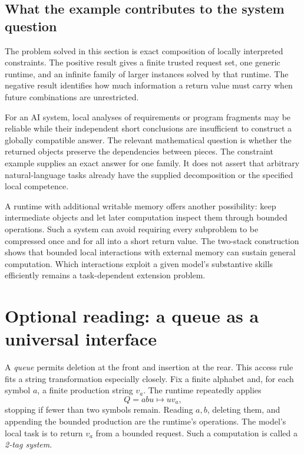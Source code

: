 \documentclass[11pt,twoside]{article}
\theoremstyle{definition}
\theoremstyle{remark}
\begin{document}
\subsection{What the example contributes to the system question}

The problem solved in this section is exact composition of locally
interpreted constraints. The positive result gives a finite trusted request
set, one generic runtime, and an infinite family of larger instances solved
by that runtime. The negative result identifies how much information a
return value must carry when future combinations are unrestricted.

For an AI system, local analyses of requirements or program fragments may
be reliable while their independent short conclusions are insufficient to
construct a globally compatible answer. The relevant mathematical question
is whether the returned objects preserve the dependencies between pieces.
The constraint example supplies an exact answer for one family. It does
not assert that arbitrary natural-language tasks already have the supplied
decomposition or the specified local competence.

A runtime with additional writable memory offers another possibility:
keep intermediate objects and let later computation inspect them through
bounded operations. Such a system can avoid requiring every subproblem to
be compressed once and for all into a short return value. The two-stack
construction shows that bounded local interactions with external memory
can sustain general computation. Which interactions exploit a given model's
substantive skills efficiently remains a task-dependent extension problem.

\section{Optional reading: a queue as a universal interface}
\label{sec:queue}

A \emph{queue} permits deletion at the front and insertion at the rear.
This access rule fits a string transformation especially closely. Fix a
finite alphabet and, for each symbol $a$, a finite production string $v_a$.
The runtime repeatedly applies
\begin{equation}
 Q=abu\longmapsto uv_a,
 \label{eq:tag}
\end{equation}
stopping if fewer than two symbols remain. Reading $a,b$, deleting them,
and appending the bounded production are the runtime's operations. The
model's local task is to return $v_a$ from a bounded request. Such a
computation is called a \emph{2-tag system}.
\end{document}
